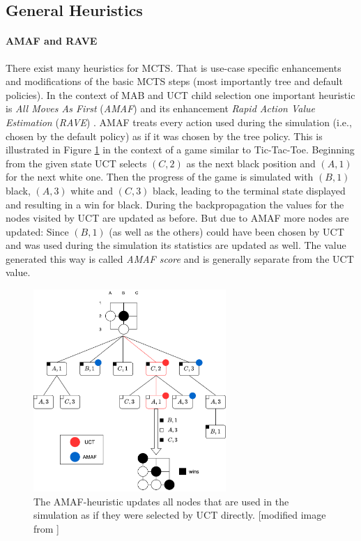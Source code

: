 \subsection{General Heuristics}
\label{ss:heuristics}
\paragraph{AMAF and RAVE} There exist many heuristics for MCTS. That is use-case specific enhancements and modifications of the basic MCTS steps (most importantly tree and default policies). In the context of MAB and UCT child selection one important heuristic is \textit{All Moves As First} (\textit{AMAF}) \cite{gelly2007combining} and its enhancement \textit{Rapid Action Value Estimation} (\textit{RAVE}) \cite{gelly2011monte}. AMAF treats every action used during the simulation (i.e., chosen by the default policy) as if it was chosen by the tree policy. This is illustrated in Figure \ref{fig:amaf} in the context of a game similar to Tic-Tac-Toe. Beginning from the given state UCT selects $(C,2)$ as the next black position and $(A,1)$ for the next white one. Then the progress of the game is simulated with $(B,1)$ black, $(A,3)$ white and $(C,3)$ black, leading to the terminal state displayed and resulting in a win for black. During the backpropagation the values for the nodes visited by UCT are updated as before. But due to AMAF more nodes are updated: Since $(B,1)$ (as well as the others) could have been chosen by UCT and was used during the simulation its statistics are updated as well. The value generated this way is called \textit{AMAF score} and is generally separate from the UCT value.
\begin{figure}[ht]
    \centering
    \includegraphics[width=0.65\textwidth]{img/amaf.png}
    \caption{The AMAF-heuristic updates all nodes that are used in the simulation as if they were selected by UCT directly. [modified image from \cite{browne2012survey}]}
    \label{fig:amaf}
\end{figure}
